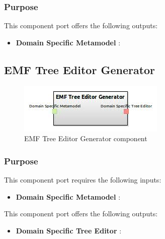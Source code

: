 \documentclass{gemoc} %
\begin{document}
\subsubsection{Purpose}


This component port offers the following outputs:
\begin{itemize}
  \item \textbf{Domain Specific Metamodel} :
\end{itemize}

\subsection{EMF Tree Editor Generator}

\begin{figure}[htp]
	\begin{center}
	\includegraphics*[trim=0.0cm 0.0cm 0cm 0.0cm, clip=true, scale=1.0]{../images/generated/Generated_EMF Tree Editor Generator.jpg}
	\caption{EMF Tree Editor Generator component}
	\end{center}
\end{figure}

\subsubsection{Purpose}

This component port requires the following inputs:
\begin{itemize}
  \item \textbf{Domain Specific Metamodel} :
\end{itemize}

This component port offers the following outputs:
\begin{itemize}
  \item \textbf{Domain Specific Tree Editor} :
\end{itemize}
\end{document}
